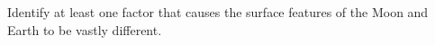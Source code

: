 \documentclass{article}
\numberwithin{equation}{section}
\numberwithin{figure}{section}
\begin{document}
\begin{exercise}
    Identify at least one factor that causes the surface features of the Moon and Earth to be vastly different.
\end{exercise}








\end{document}
